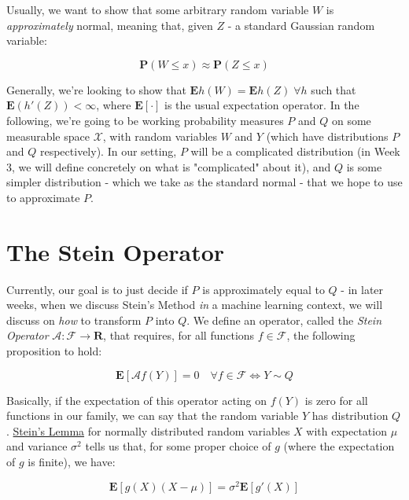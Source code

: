 \documentclass[12pt]{article}
\begin{document}
\noindent Usually, we want to show that some arbitrary random variable $W$ is \textit{approximately} normal, meaning that, given $Z$ - a standard Gaussian random variable:

\begin{equation}
\mathbf{P}(W \leq x) \approx \mathbf{P}(Z \leq x)
\end{equation}

\noindent Generally, we're looking to show that $\mathbf{E}h(W) = \mathbf{E}h(Z) \; \forall h$ such that $\mathbf{E}(h'(Z)) < \infty$, where $\mathbf{E}[\cdot]$ is the usual expectation operator. In the following, we're going to be working probability measures $P$ and $Q$ on some measurable space $\mathcal{X}$, with random variables $W$ and $Y$ (which have distributions $P$ and $Q$ respectively). In our setting, $P$ will be a complicated distribution (in Week 3, we will define concretely on what is "complicated" about it), and $Q$ is some simpler distribution - which we take as the standard normal - that we hope to use to approximate $P$.

\section{The Stein Operator} 

\noindent Currently, our goal is to just decide if $P$ is approximately equal to $Q$ - in later weeks, when we discuss Stein's Method \textit{in} a machine learning context, we will discuss on \textit{how} to transform $P$ into $Q$.  We define an operator, called the \textit{Stein Operator} $\mathcal{A}: \mathcal{F} \rightarrow \mathbf{R}$, that requires, for all functions $f \in \mathcal{F}$, the following proposition to hold:

\begin{equation}
    \mathbf{E}[\mathcal{A}f(Y)] = 0 \quad \forall f \in \mathcal{F} \Leftrightarrow Y \sim Q
\end{equation}

\noindent  Basically, if the expectation of this operator acting on $f(Y)$ is zero for all functions in our family, we can say that the random variable $Y$ has distribution $Q$. \href{https://en.wikipedia.org/wiki/Stein\%27s_lemma}{Stein's Lemma} \cite{Ingersoll1987TheoryOF} for normally distributed random variables $X$ with expectation $\mu$ and variance $\sigma^2$ tells us that, for some proper choice of $g$ (where the expectation of $g$ is finite), we have:

\begin{equation} 
    \mathbf{E}[g(X)(X - \mu)] = \sigma^2\mathbf{E}[g'(X)]
\end{equation}
\end{document}
